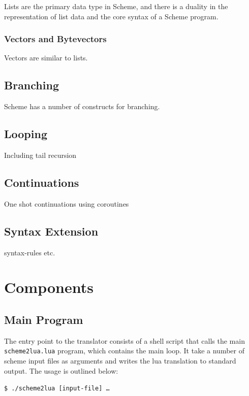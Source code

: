 Lists are the primary data type in Scheme, and there is a duality in the
representation of list data and the core syntax of a Scheme program.

\subsubsection{Vectors and Bytevectors}

Vectors are similar to lists.

\subsection{Branching}

Scheme has a number of constructs for branching.

\subsection{Looping}

Including tail recursion

\subsection{Continuations}

One shot continuations using coroutines

\subsection{Syntax Extension}

syntax-rules etc.


\section{Components}

\subsection{Main Program}

The entry point to the translator consists of a shell script that calls the main
\texttt{scheme2lua.lua} program, which contains the main loop. It take a number
of scheme input files as arguments and writes the lua translation to standard
output. The usage is outlined below:

\begin{framed}
\texttt{\$ ./scheme2lua [input-file] \ldots}
\end{framed}

